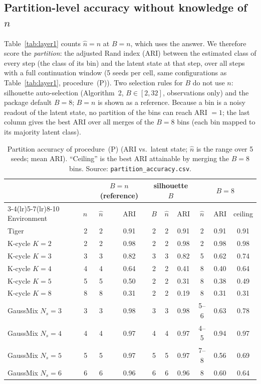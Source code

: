 \documentclass[10pt]{article}
\begin{document}
\subsection{Partition-level accuracy without knowledge of $n$}
\label{sec:partition}
Table~\ref{tab:layer1} counts $\hat n=n$ at $B=n$, which uses the answer.  We
therefore score the \emph{partition}: the adjusted Rand index (ARI) between the
estimated class of every step (the class of its bin) and the latent state at
that step, over all steps with a full continuation window (5 seeds per cell,
same configurations as Table~\ref{tab:layer1}, procedure~(P)).  Two
selection rules for $B$ do not use $n$: silhouette auto-selection
(Algorithm~2, $B\in[2,32]$, observations only) and the package default
$B=8$; $B=n$ is shown as a reference.  Because a bin is a noisy readout of the
latent state, no partition of the bins can reach ARI $=1$; the last column gives
the best ARI over all merges of the $B=8$ bins (each bin mapped to its majority
latent class).

\begin{table}[t]
\centering
\small
\caption{Partition accuracy of procedure~(P) (ARI vs.\ latent state; $\hat n$
  is the range over 5 seeds; mean ARI). ``Ceiling'' is the best ARI attainable
  by merging the $B=8$ bins.  Source: \texttt{partition\_accuracy.csv}.}
\label{tab:ari}
\begin{tabular}{lrcccccccc}
\toprule
 & & \multicolumn{2}{c}{$B=n$ (reference)} & \multicolumn{3}{c}{silhouette $B$} & \multicolumn{3}{c}{$B=8$} \\
\cmidrule(lr){3-4}\cmidrule(lr){5-7}\cmidrule(lr){8-10}
Environment & $n$ & $\hat n$ & ARI & $B$ & $\hat n$ & ARI & $\hat n$ & ARI & ceiling \\
\midrule
Tiger & 2 & 2 & 0.91 & 2 & 2 & 0.91 & 2 & 0.91 & 0.91 \\
K-cycle $K{=}2$ & 2 & 2 & 0.98 & 2 & 2 & 0.98 & 2 & 0.98 & 0.98 \\
K-cycle $K{=}3$ & 3 & 3 & 0.82 & 3 & 3 & 0.82 & 5 & 0.62 & 0.74 \\
K-cycle $K{=}4$ & 4 & 4 & 0.64 & 2 & 2 & 0.41 & 8 & 0.40 & 0.64 \\
K-cycle $K{=}5$ & 5 & 5 & 0.50 & 2 & 2 & 0.31 & 8 & 0.38 & 0.49 \\
K-cycle $K{=}8$ & 8 & 8 & 0.31 & 2 & 2 & 0.19 & 8 & 0.31 & 0.31 \\
GaussMix $N_s{=}3$ & 3 & 3 & 0.98 & 3 & 3 & 0.98 & 5--6 & 0.63 & 0.78 \\
GaussMix $N_s{=}4$ & 4 & 4 & 0.97 & 4 & 4 & 0.97 & 4--5 & 0.94 & 0.97 \\
GaussMix $N_s{=}5$ & 5 & 5 & 0.97 & 5 & 5 & 0.97 & 7--8 & 0.56 & 0.69 \\
GaussMix $N_s{=}6$ & 6 & 6 & 0.96 & 6 & 6 & 0.96 & 8 & 0.60 & 0.64 \\
\bottomrule
\end{tabular}
\end{table}
\end{document}
